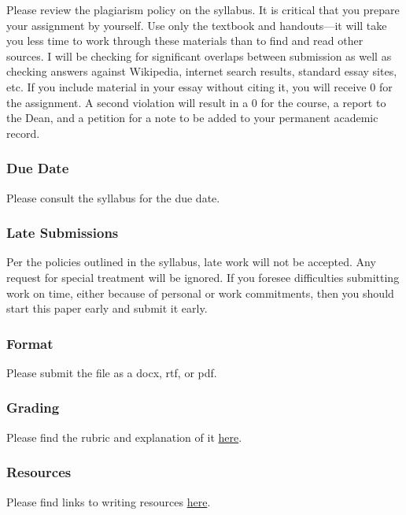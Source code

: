 \documentclass[]{article}
\begin{document}
Please review the plagiarism policy on the syllabus. It is critical that
you prepare your assignment by yourself. Use only the textbook and
handouts---it will take you less time to work through these materials
than to find and read other sources. I will be checking for significant
overlaps between submission as well as checking answers against
Wikipedia, internet search results, standard essay sites, etc. If you
include material in your essay without citing it, you will receive 0 for
the assignment. A second violation will result in a 0 for the course, a
report to the Dean, and a petition for a note to be added to your
permanent academic record.

\subsubsection{Due Date}\label{due-date}

Please consult the syllabus for the due date.

\subsubsection{Late Submissions}\label{late-submissions}

Per the policies outlined in the syllabus, late work will not be
accepted. Any request for special treatment will be ignored. If you
foresee difficulties submitting work on time, either because of personal
or work commitments, then you should start this paper early and submit
it early.

\subsubsection{Format}\label{format}

Please submit the file as a docx, rtf, or pdf.

\subsubsection{Grading}\label{grading}

Please find the rubric and explanation of it
\href{/Teaching/Grading/}{here}.

\subsubsection{Resources}\label{resources}

Please find links to writing resources
\href{/Teaching/Resources/}{here}.
\end{document}
